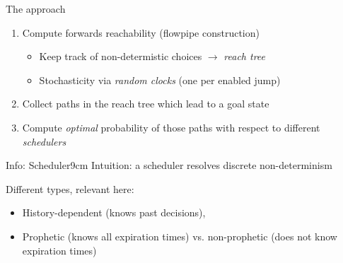 \documentclass[aspectratio=169]{beamer}
\begin{document}
\begin{frame}{The approach}

  \begin{enumerate}
    \item Compute forwards reachability (flowpipe construction)
    \begin{itemize}
      \item Keep track of non-determistic choices $\rightarrow$ \emph{reach tree}
      \item Stochasticity via \emph{random clocks} (one per enabled jump)
    \end{itemize}
    \item Collect paths in the reach tree which lead to a goal state
    \item Compute \emph{optimal} probability of those paths with respect to different \emph{schedulers}
  \end{enumerate}

  \bigskip

  \centering
  \begin{reminder}{\scriptsize Info: Scheduler}{9cm}
    \tiny
    Intuition: a scheduler resolves discrete non-determinism

    Different types, relevant here:
    \begin{itemize}
      \item History-dependent (knows past decisions),
      \item Prophetic (knows all expiration times) vs. non-prophetic (does not know expiration times)
    \end{itemize}
  \end{reminder}
\end{frame}

\end{document}
